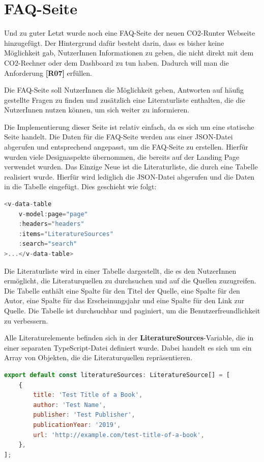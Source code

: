 \section{FAQ-Seite}

Und zu guter Letzt wurde noch eine FAQ-Seite der neuen CO2-Runter Webseite hinzugefügt. Der Hintergrund dafür besteht darin, dass es bisher keine Möglichkeit gab, NutzerInnen Informationen zu geben, die nicht direkt mit dem CO2-Rechner oder dem Dashboard zu tun haben. Dadurch will man die Anforderung \textbf{[R07]} erfüllen.

Die FAQ-Seite soll NutzerInnen die Möglichkeit geben, Antworten auf häufig gestellte Fragen zu finden und zusätzlich eine Literaturliste enthalten, die die NutzerInnen nutzen können, um sich weiter zu informieren.

Die Implementierung dieser Seite ist relativ einfach, da es sich um eine statische Seite handelt. Die Daten für die FAQ-Seite werden aus einer \acs{JSON}-Datei abgerufen und entsprechend angepasst, um die FAQ-Seite zu erstellen. Hierfür wurden viele Designaspekte übernommen, die bereits auf der Landing Page verwendet wurden. Das Einzige Neue ist die Literaturliste, die durch eine Tabelle realisiert wurde. Hierfür wird lediglich die \acs{JSON}-Datei abgerufen und die Daten in die Tabelle eingefügt. Dies geschieht wie folgt:

\begin{lstlisting}[language={JavaScript}, caption={Laden der Literaturliste}]
<v-data-table
    v-model:page="page"
    :headers="headers"
    :items="LiteratureSources"
    :search="search"
>...</v-data-table>
\end{lstlisting}

Die Literaturliste wird in einer Tabelle dargestellt, die es den NutzerInnen ermöglicht, die Literaturquellen zu durchsuchen und auf die Quellen zuzugreifen. Die Tabelle enthält eine Spalte für den Titel der Quelle, eine Spalte für den Autor, eine Spalte für das Erscheinungsjahr und eine Spalte für den Link zur Quelle. Die Tabelle ist durchsuchbar und paginiert, um die Benutzerfreundlichkeit zu verbessern.

Alle Literaturelemente befinden sich in der \textbf{LiteratureSources}-Variable, die in einer separaten TypeScript-Datei definiert wurde. Dabei handelt es sich um ein Array von Objekten, die die Literaturquellen repräsentieren.

\begin{lstlisting}[language={JavaScript}, caption={Literaturelemente}]
export default const literatureSources: LiteratureSource[] = [
    {
        title: 'Test Title of a Book',
        author: 'Test Name',
        publisher: 'Test Publisher',
        publicationYear: '2019',
        url: 'http://example.com/test-title-of-a-book',
    },
];
\end{lstlisting}


